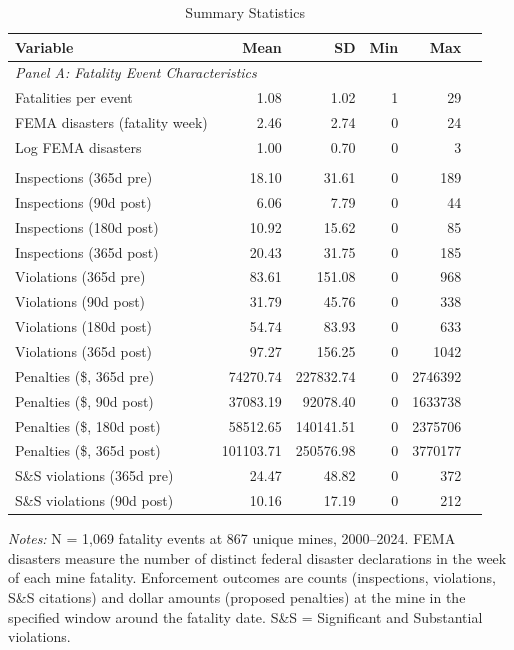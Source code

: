 \begin{table}[H]
\centering
\caption{Summary Statistics}
\begin{threeparttable}
\begin{tabular}{lrrrrr}
\toprule
Variable & Mean & SD & Min & Max \\
\midrule
\multicolumn{5}{l}{\textit{Panel A: Fatality Event Characteristics}} \\
Fatalities per event & 1.08 & 1.02 & 1 & 29 \\
FEMA disasters (fatality week) & 2.46 & 2.74 & 0 & 24 \\
Log FEMA disasters & 1.00 & 0.70 & 0 & 3 \\
\addlinespace
\multicolumn{5}{l}{\textit{Panel B: Enforcement Outcomes}} \\
Inspections (365d pre) & 18.10 & 31.61 & 0 & 189 \\
Inspections (90d post) & 6.06 & 7.79 & 0 & 44 \\
Inspections (180d post) & 10.92 & 15.62 & 0 & 85 \\
Inspections (365d post) & 20.43 & 31.75 & 0 & 185 \\
Violations (365d pre) & 83.61 & 151.08 & 0 & 968 \\
Violations (90d post) & 31.79 & 45.76 & 0 & 338 \\
Violations (180d post) & 54.74 & 83.93 & 0 & 633 \\
Violations (365d post) & 97.27 & 156.25 & 0 & 1042 \\
Penalties (\$, 365d pre) & 74270.74 & 227832.74 & 0 & 2746392 \\
Penalties (\$, 90d post) & 37083.19 & 92078.40 & 0 & 1633738 \\
Penalties (\$, 180d post) & 58512.65 & 140141.51 & 0 & 2375706 \\
Penalties (\$, 365d post) & 101103.71 & 250576.98 & 0 & 3770177 \\
S\&S violations (365d pre) & 24.47 & 48.82 & 0 & 372 \\
S\&S violations (90d post) & 10.16 & 17.19 & 0 & 212 \\
\bottomrule
\end{tabular}
\begin{tablenotes}[flushleft]
\small
\item \textit{Notes:} N = 1,069 fatality events at 867 unique mines, 2000--2024. FEMA disasters measure the number of distinct federal disaster declarations in the week of each mine fatality. Enforcement outcomes are counts (inspections, violations, S\&S citations) and dollar amounts (proposed penalties) at the mine in the specified window around the fatality date. S\&S = Significant and Substantial violations.
\end{tablenotes}
\end{threeparttable}
\label{tab:summary}
\end{table}

